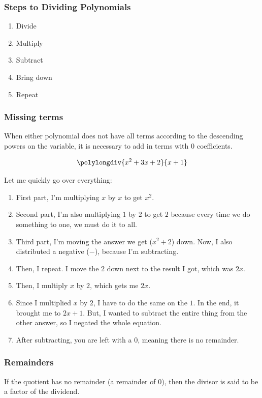 
\subsubsection*{Steps to Dividing Polynomials}

\begin{enumerate}
    \item Divide
    \item Multiply
    \item Subtract
    \item Bring down
    \item Repeat
\end{enumerate}

\subsubsection*{Missing terms}

When either polynomial does not have all terms according to the descending powers on the variable, it is necessary to add in terms with $0$ coefficients.

\begin{example}
    \[ \polylongdiv{x^2 + 3x + 2}{x + 1} \]
    
    Let me quickly go over everything:
    
    \begin{enumerate}
        \item First part, I'm multiplying $x$ by $x$ to get $x^2$.
        \item Second part, I'm also multiplying $1$ by $2$ to get $2$ because every time we do something to one, we must do it to all.
        \item Third part, I'm moving the answer we get ($x^2 + 2$) down. Now, I also distributed a negative ($-$), because I'm subtracting.
        \item Then, I repeat. I move the $2$ down next to the result I got, which was $2x$.
        \item Then, I multiply $x$ by $2$, which gets me $2x$.
        \item Since I multiplied $x$ by $2$, I have to do the same on the $1$. In the end, it brought me to $2x + 1$. But, I wanted to subtract the entire thing from the other answer, so I negated the whole equation.
        \item After subtracting, you are left with a $0$, meaning there is no remainder.
    \end{enumerate}
\end{example}

\subsubsection*{Remainders}

If the quotient has no remainder (a remainder of $0$), then the divisor is said to be a factor of the dividend.

\newpage
